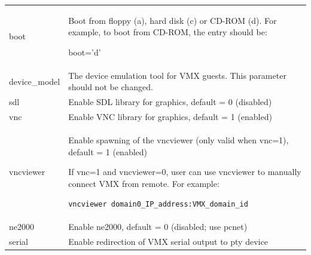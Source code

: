 \documentclass[11pt,twoside,final,openright]{report}
\begin{document}
\begin{tabular}{lp{11.0cm}}
boot & Boot from floppy (a), hard disk (c) or CD-ROM (d). For example, to boot from CD-ROM, the entry should be:

boot='d'\\

device\_model & The device emulation tool for VMX guests. This parameter should not be changed.\\

sdl &   Enable SDL library for graphics, default = 0 (disabled)\\

vnc &   Enable VNC library for graphics, default = 1 (enabled)\\

vncviewer &     Enable spawning of the vncviewer (only valid when vnc=1), default = 1 (enabled)

If vnc=1 and vncviewer=0, user can use vncviewer to manually connect VMX from remote. For example:

{\small {\tt vncviewer domain0\_IP\_address:VMX\_domain\_id}} \\

ne2000 &        Enable ne2000, default = 0 (disabled; use pcnet)\\

serial &        Enable redirection of VMX serial output to pty device\\

\end{tabular}
\end{document}
